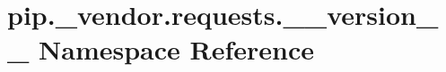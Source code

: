 \hypertarget{namespacepip_1_1__vendor_1_1requests_1_1____version____}{}\section{pip.\+\_\+vendor.\+requests.\+\_\+\+\_\+version\+\_\+\+\_\+ Namespace Reference}
\label{namespacepip_1_1__vendor_1_1requests_1_1____version____}

